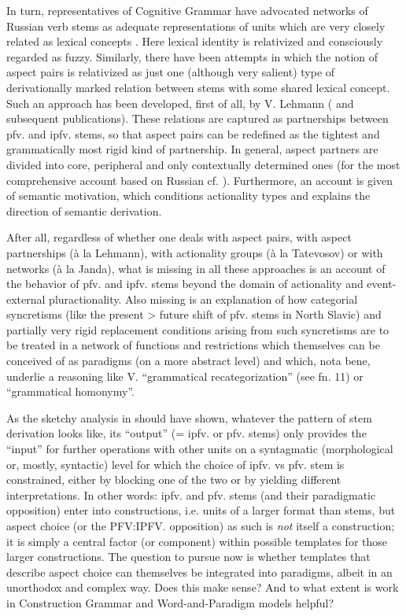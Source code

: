 \documentclass[output=paper]{langscibook}
\begin{document}
In turn, representatives of Cognitive Grammar have advocated networks of Russian verb stems as adequate representations of units which are very closely related as lexical concepts \citep{Janda2007}. Here lexical identity is relativized and consciously regarded as fuzzy. Similarly, there have been attempts in which the notion of aspect pairs is relativized as just one (although very salient) type of derivationally marked relation between stems with some shared lexical concept. Such an approach has been developed, first of all, by V. Lehmann (\citeyear{Lehmann1988} and subsequent publications). These relations are captured as partnerships between pfv. and ipfv. stems, so that aspect pairs can be redefined as the tightest and grammatically most rigid kind of partnership. In general, aspect partners are divided into core, peripheral and only contextually determined ones (for the most comprehensive account based on Russian cf. \citealt{MendeEtAl2011}). Furthermore, an account is given of semantic motivation, which conditions actionality types and explains the direction of semantic derivation.

After all, regardless of whether one deals with aspect pairs, with aspect partnerships (à la Lehmann), with actionality groups (à la Tatevosov) or with networks (à la Janda), what is missing in all these approaches is an account of the behavior of pfv. and ipfv. stems beyond the domain of actionality and event-external pluractionality. Also missing is an explanation of how categorial syncretisms (like the present > future shift of pfv. stems in North Slavic) and partially very rigid replacement conditions arising from such syncretisms are to be treated in a network of functions and restrictions which themselves can be conceived of as paradigms (on a more abstract level) and which, nota bene, underlie a reasoning like V.  ``grammatical recategorization'' (see fn. 11) or  ``grammatical homonymy''.

As the sketchy analysis in  should have shown, whatever the pattern of stem derivation looks like, its “output” (= ipfv. or pfv. stems) only provides the “input” for further operations with other units on a syntagmatic (morphological or, mostly, syntactic) level for which the choice of ipfv. vs pfv. stem is constrained, either by blocking one of the two or by yielding different interpretations. In other words: ipfv. and pfv. stems (and their paradigmatic opposition) enter into constructions, i.e. units of a larger format than stems, but aspect choice (or the PFV:IPFV. opposition) as such is \emph{not} itself a construction; it is simply a central factor (or component) within possible templates for those larger constructions. The question to pursue now is whether templates that describe aspect choice can themselves be integrated into paradigms, albeit in an unorthodox and complex way. Does this make sense? And to what extent is work in Construction Grammar and Word-and-Paradigm models helpful?
\end{document}
